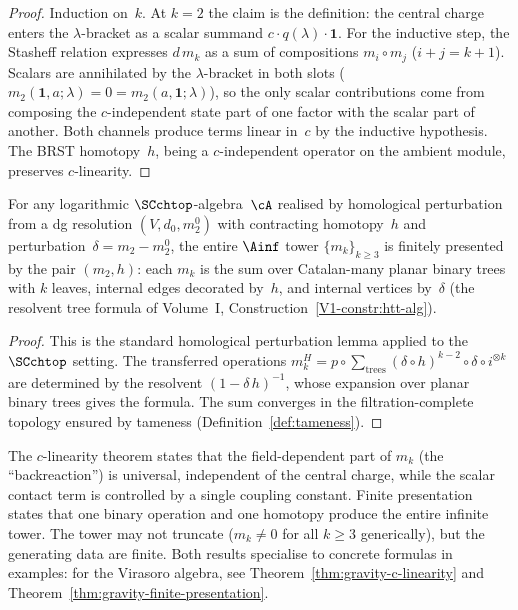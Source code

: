 \begin{proof}
Induction on~$k$. At $k = 2$ the claim is the definition:
the central charge enters the $\lambda$-bracket as a scalar
summand $c \cdot q(\lambda) \cdot \mathbf{1}$. For the inductive
step, the Stasheff relation expresses $d\,m_k$ as a sum of
compositions $m_i \circ m_j$ ($i+j = k+1$). Scalars are
annihilated by the $\lambda$-bracket in both slots
($m_2(\mathbf{1}, a; \lambda) = 0 = m_2(a, \mathbf{1}; \lambda)$),
so the only scalar contributions come from composing the
$c$-independent state part of one factor with the scalar part
of another. Both channels produce terms linear in~$c$ by the
inductive hypothesis. The BRST homotopy~$h$, being a
$c$-independent operator on the ambient module, preserves
$c$-linearity.
\end{proof}

\begin{proposition}
\label{prop:finite-presentation-general}
For any logarithmic $\SCchtop$-algebra~$\cA$ realised by
homological perturbation from a dg resolution
$(V, d_0, m_2^0)$ with contracting homotopy~$h$
and perturbation~$\delta = m_2 - m_2^0$,
the entire $\Ainf$ tower $\{m_k\}_{k \ge 3}$ is finitely
presented by the pair $(m_2, h)$: each $m_k$ is the sum
over Catalan-many planar binary trees with $k$ leaves,
internal edges decorated by~$h$, and internal vertices
by~$\delta$ \textup{(}the resolvent tree formula of Volume~I,
Construction~\ref*{V1-constr:htt-alg}\textup{)}.
\end{proposition}

\begin{proof}
This is the standard homological perturbation lemma
applied to the $\SCchtop$ setting.
The transferred operations $m_k^H = p \circ
\sum_{\text{trees}} (\delta \circ h)^{k-2} \circ \delta
\circ i^{\otimes k}$ are determined by the resolvent
$(1 - \delta\,h)^{-1}$, whose expansion over planar
binary trees gives the formula. The sum converges in the
filtration-complete topology ensured by tameness
(Definition~\ref{def:tameness}).
\end{proof}

\begin{remark}[Content]
\label{rem:c-linearity-content}
The $c$-linearity theorem states that the
field-dependent part of $m_k$ (the ``backreaction'') is
universal, independent of the central charge, while the
scalar contact term is controlled by a single coupling
constant. Finite presentation states that one binary
operation and one homotopy produce the entire infinite
tower. The tower may not truncate ($m_k \ne 0$ for all
$k \ge 3$ generically), but the generating data are finite.
Both results specialise to concrete formulas in examples:
for the Virasoro algebra, see
Theorem~\ref{thm:gravity-c-linearity} and
Theorem~\ref{thm:gravity-finite-presentation}.
\end{remark}

